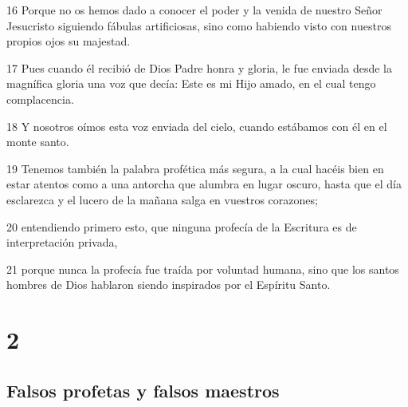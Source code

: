 \par 16 Porque no os hemos dado a conocer el poder y la venida de nuestro Señor Jesucristo siguiendo fábulas artificiosas, sino como habiendo visto con nuestros propios ojos su majestad.
\par 17 Pues cuando él recibió de Dios Padre honra y gloria, le fue enviada desde la magnífica gloria una voz que decía: Este es mi Hijo amado, en el cual tengo complacencia.
\par 18 Y nosotros oímos esta voz enviada del cielo, cuando estábamos con él en el monte santo.
\par 19 Tenemos también la palabra profética más segura, a la cual hacéis bien en estar atentos como a una antorcha que alumbra en lugar oscuro, hasta que el día esclarezca y el lucero de la mañana salga en vuestros corazones;
\par 20 entendiendo primero esto, que ninguna profecía de la Escritura es de interpretación privada,
\par 21 porque nunca la profecía fue traída por voluntad humana, sino que los santos hombres de Dios hablaron siendo inspirados por el Espíritu Santo.

\chapter{2}

\section*{Falsos profetas y falsos maestros}

